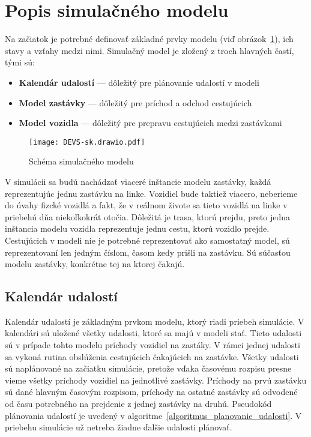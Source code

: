 \section{Popis simulačného modelu}
Na začiatok je potrebné definovať základné prvky modelu (viď obrázok~\ref{fig:simulacny_model}), ich stavy a vzťahy medzi nimi.
Simulačný model je zložený z troch hlavných častí, tými sú:
\begin{itemize}
  \item \textbf{Kalendár udalostí} --- dôležitý pre plánovanie udalostí v modeli
  \item \textbf{Model zastávky} --- dôležitý pre príchod a odchod cestujúcich
  \item \textbf{Model vozidla} --- dôležitý pre prepravu cestujúcich medzi zastávkami
\end{itemize}

\begin{figure}[h]\label{fig:simulacny_model}
  \centering
  \texttt{[image: DEVS-sk.drawio.pdf]}
  \caption{Schéma simulačného modelu}
\end{figure}

V simulácii sa budú nachádzať viaceré inštancie modelu zastávky, každá reprezentujúc jednu zastávku na linke.
Vozidiel bude taktiež viacero, neberieme do úvahy fizcké vozidlá a fakt, že v reálnom živote sa tieto vozidlá na linke v priebehú dňa niekoľkokrát otočia.
Dôležitá je trasa, ktorú prejdu, preto jedna inštancia modelu vozidla reprezentuje jednu cestu, ktorú vozidlo prejde.
Cestujúcich v modeli nie je potrebné reprezentovať ako samostatný model, sú reprezentovaní len jedným číslom, časom kedy prišli na zastávku.
Sú súčasťou modelu zastávky, konkrétne tej na ktorej čakajú.

\subsection*{Kalendár udalostí}

Kalendár udalostí je základným prvkom modelu, ktorý riadi priebeh simulácie.
V kalendári sú uložené všetky udalosti, ktoré sa majú v modeli stať.
Tieto udalosti sú v prípade tohto modelu príchody vozidiel na zastáky.
V rámci jednej udalosti sa vykoná rutina obslúženia cestujúcich čakajúcich na zastávke.
Všetky udalosti sú naplánované na začiatku simulácie, pretože vďaka časovému rozpisu presne vieme všetky príchody vozidiel na jednotlivé zastávky.
Príchody na prvú zastávku sú dané hlavným časovým rozpisom, príchody na ostatné zastávky sú odvodené od času potrebného na prejdenie z jednej zastávky na druhú.
Pseudokód plánovania udalostí je uvedený v algoritme~\ref{algoritmus_planovanie_udalosti}.
V priebehu simulácie už netreba žiadne ďalšie udalosti plánovať.

